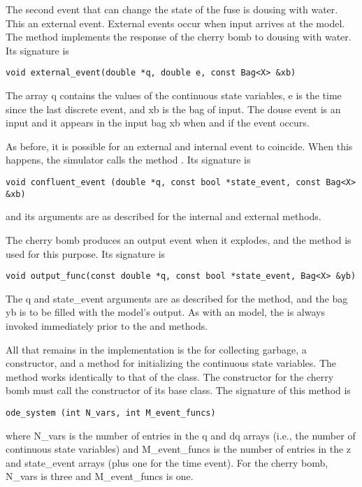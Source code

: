 The second event that can change the state of the fuse is dousing with water. This an external event. External events occur when input arrives at the model. The  method implements the response of the cherry bomb to dousing with water. Its signature is
\begin{verbatim}
void external_event(double *q, double e, const Bag<X> &xb)
\end{verbatim}
The array q contains the values of the continuous state variables, e is the time since the last discrete event, and xb is the bag of input. The douse event is an input and it appears in the input bag xb when and if the event occurs. 

As before, it is possible for an external and internal event to coincide. When this happens, the simulator calls the method . Its signature is
\begin{verbatim}
void confluent_event (double *q, const bool *state_event, const Bag<X> &xb)
\end{verbatim}
and its arguments are as described for the internal and external methods.

The cherry bomb produces an output event when it explodes, and the  method is used for this purpose. Its signature is
\begin{verbatim}
void output_func(const double *q, const bool *state_event, Bag<X> &yb)
\end{verbatim}
The q and state\_event arguments are as described for the  method, and the bag yb is to be filled with the model's output. As with an  model, the  is always invoked immediately prior to the  and  methods.

All that remains in the implementation is the  for collecting garbage, a constructor, and a method for initializing the continuous state variables. The  method works identically to that of the  class. The constructor for the cherry bomb must call the constructor of its  base class. The signature of this method is
\begin{verbatim}
ode_system (int N_vars, int M_event_funcs)
\end{verbatim}
where N\_vars is the number of entries in the q and dq arrays (i.e., the number of continuous state variables) and M\_event\_funcs is the number of entries in the z and state\_event arrays (plus one for the time event). For the cherry bomb, N\_vars is three and M\_event\_funcs is one.

